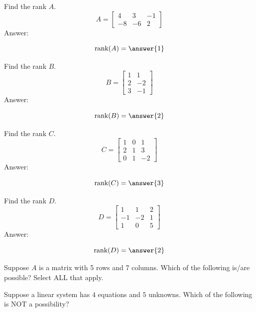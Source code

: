 \documentclass{ximera}
\begin{document}
\begin{problem}\label{prob:rankofmat1}
Find the rank $A$.
$$A=\begin{bmatrix}4&3&-1\\-8&-6&2\end{bmatrix}$$
Answer:

$$\mbox{rank}(A)=\answer{1}$$
\end{problem}

\begin{problem}\label{prob:rankofmat2}
Find the rank $B$.
$$B=\begin{bmatrix}1&1\\2&-2\\3&-1\end{bmatrix}$$
Answer:

$$\mbox{rank}(B)=\answer{2}$$
\end{problem}

\begin{problem}\label{prob:rankofmat3}
Find the rank $C$.
$$C=\begin{bmatrix}1&0&1\\2&1&3\\0&1&-2\end{bmatrix}$$
Answer:

$$\mbox{rank}(C)=\answer{3}$$
\end{problem}

\begin{problem}\label{prob:rankofmat4}
Find the rank $D$.
$$D=\begin{bmatrix}1&1&2\\-1&-2&1\\1&0&5\end{bmatrix}$$
Answer:

$$\mbox{rank}(D)=\answer{2}$$
\end{problem}


\begin{problem}\label{prob:rankofmat5}
Suppose $A$ is a matrix with 5 rows and 7 columns.  Which of the following is/are possible?  Select ALL that apply.
\begin{selectAll}
 \end{selectAll}
\end{problem}

\begin{problem}\label{prob:4eq5un}
Suppose a linear system has $4$ equations and $5$ unknowns.  Which of the following is NOT a possibility?
\begin{multipleChoice}
 \end{multipleChoice}
\end{problem}
\end{document}
